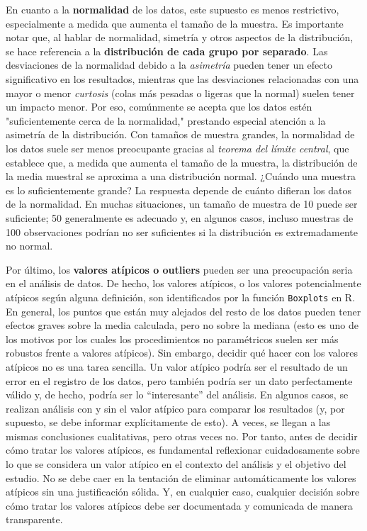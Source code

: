 \documentclass{config/apuntes}\usepackage[]{graphicx}\usepackage[]{xcolor}
\newcommand{\code}[1]{\texttt{#1}}
\begin{document}
En cuanto a la \textbf{normalidad} de los datos, este supuesto es menos restrictivo, especialmente a medida que aumenta el tamaño de la muestra. Es importante notar que, al hablar de normalidad, simetría y otros aspectos de la distribución, se hace referencia a la \textbf{distribución de cada grupo por separado}. Las desviaciones de la normalidad debido a la \textit{asimetría} pueden tener un efecto significativo en los resultados, mientras que las desviaciones relacionadas con una mayor o menor \textit{curtosis} (colas más pesadas o ligeras que la normal) suelen tener un impacto menor. Por eso, comúnmente se acepta que los datos estén "suficientemente cerca de la normalidad," prestando especial atención a la asimetría de la distribución. Con tamaños de muestra grandes, la normalidad de los datos suele ser menos preocupante gracias al \textit{teorema del límite central}, que establece que, a medida que aumenta el tamaño de la muestra, la distribución de la media muestral se aproxima a una distribución normal. ¿Cuándo una muestra es lo suficientemente grande? La respuesta depende de cuánto difieran los datos de la normalidad. En muchas situaciones, un tamaño de muestra de 10 puede ser suficiente; 50 generalmente es adecuado y, en algunos casos, incluso muestras de 100 observaciones podrían no ser suficientes si la distribución es extremadamente no normal.

Por último, los \textbf{valores atípicos o outliers} pueden ser una preocupación seria en el análisis de datos. De hecho, los valores atípicos, o los valores potencialmente atípicos según alguna definición, son identificados por la función \code{Boxplots} en R. En general, los puntos que están muy alejados del resto de los datos pueden tener efectos graves sobre la media calculada, pero no sobre la mediana (esto es uno de los motivos por los cuales los procedimientos no paramétricos suelen ser más robustos frente a valores atípicos). Sin embargo, decidir qué hacer con los valores atípicos no es una tarea sencilla. Un valor atípico podría ser el resultado de un error en el registro de los datos, pero también podría ser un dato perfectamente válido y, de hecho, podría ser lo “interesante” del análisis. En algunos casos, se realizan análisis con y sin el valor atípico para comparar los resultados (y, por supuesto, se debe informar explícitamente de esto). A veces, se llegan a las mismas conclusiones cualitativas, pero otras veces no. Por tanto, antes de decidir cómo tratar los valores atípicos, es fundamental reflexionar cuidadosamente sobre lo que se considera un valor atípico en el contexto del análisis y el objetivo del estudio. No se debe caer en la tentación de eliminar automáticamente los valores atípicos sin una justificación sólida. Y, en cualquier caso, cualquier decisión sobre cómo tratar los valores atípicos debe ser documentada y comunicada de manera transparente.
\end{document}

